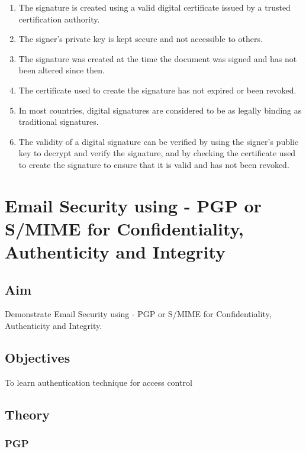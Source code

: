 \documentclass[openany]{book}
\begin{document}
\begin{enumerate}
\begin{enumerate}
              \item The signature is created using a valid digital certificate issued by a trusted certification authority.
              \item The signer's private key is kept secure and not accessible to others.
              \item The signature was created at the time the document was signed and has not been altered since then.
              \item The certificate used to create the signature has not expired or been revoked.
              \item In most countries, digital signatures are considered to be as legally binding as traditional signatures.
              \item The validity of a digital signature can be verified by using the signer's public key to decrypt and verify the signature, and by checking the certificate used to create the signature to ensure that it is valid and has not been revoked.
          \end{enumerate}
\end{enumerate}


\chapter{Email Security using - PGP or S/MIME for Confidentiality, Authenticity and Integrity}
\section{Aim}
Demonstrate Email Security using - PGP or S/MIME for Confidentiality, Authenticity and Integrity.

\section{Objectives}
To learn authentication technique for access control

\section{Theory}

\subsection{PGP}
\end{document}
